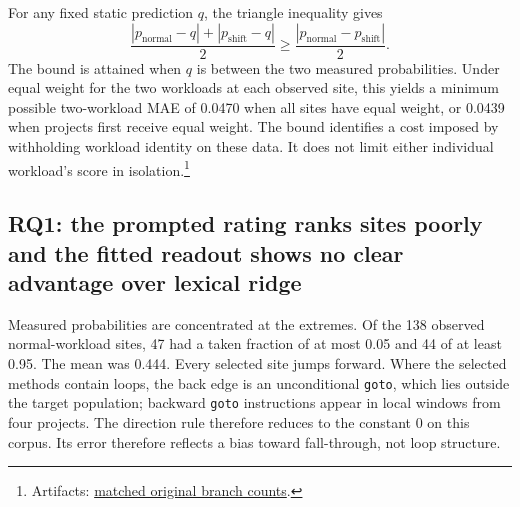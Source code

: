 \documentclass[11pt]{article}
\newcommand{\repocommit}{81d03caebe268d013b3163bcbff31cadabaaec21}
\newcommand{\repourl}{https://github.com/minggu151623/llm_profiling_research}
\newcommand{\repo}[2]{\href{\repourl/blob/\repocommit/#1}{#2}}
\newcommand{\artifacts}[1]{\footnote{Artifacts: #1.}}
\begin{document}
For any fixed static prediction $q$, the triangle inequality gives
\[
  \frac{|p_{\mathrm{normal}}-q|+|p_{\mathrm{shift}}-q|}{2} \geq \frac{|p_{\mathrm{normal}}-p_{\mathrm{shift}}|}{2}.
\]
The bound is attained when $q$ is between the two measured probabilities. Under equal weight for the two workloads at each observed site, this yields a minimum possible two-workload MAE of 0.0470 when all sites have equal weight, or 0.0439 when projects first receive equal weight. The bound identifies a cost imposed by withholding workload identity on these data. It does not limit either individual workload's score in isolation.\artifacts{\repo{experiments/study/corpus}{matched original branch counts}}

\subsection{RQ1: the prompted rating ranks sites poorly and the fitted readout shows no clear advantage over lexical ridge}

Measured probabilities are concentrated at the extremes. Of the 138 observed normal-workload sites, 47 had a taken fraction of at most 0.05 and 44 of at least 0.95. The mean was 0.444. Every selected site jumps forward. Where the selected methods contain loops, the back edge is an unconditional \texttt{goto}, which lies outside the target population; backward \texttt{goto} instructions appear in local windows from four projects. The direction rule therefore reduces to the constant 0 on this corpus. Its error therefore reflects a bias toward fall-through, not loop structure.
\end{document}
